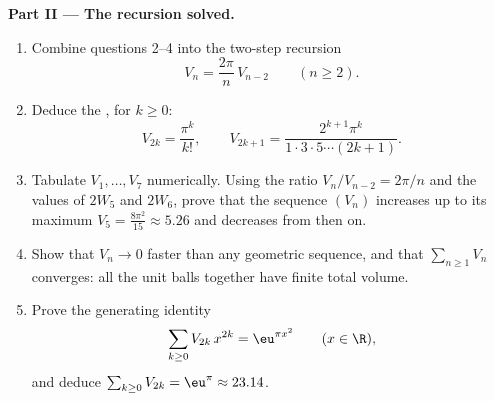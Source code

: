 \begin{problem}[{Weekend problem --- $V_n =
\pi^{n/2}/\Gamma(\frac n2 + 1)$, and the strangeness of high
dimensions}]
\medskip
\noindent\textbf{Part II --- The recursion solved.}
\begin{enumerate}[resume]
  \item Combine questions 2--4 into the two-step recursion
        \[
        V_n = \frac{2\pi}{n}\,V_{n-2}
        \qquad (n \geq 2).
        \]
  \item Deduce the , for $k \geq 0$:
        \[
        V_{2k} = \frac{\pi^k}{k!},
        \qquad
        V_{2k+1} = \frac{2^{k+1}\pi^k}{1\cdot3\cdot5\cdots
        (2k+1)} .
        \]
  \item Tabulate $V_1, \dots, V_7$ numerically. Using the
        ratio $V_n/V_{n-2} = 2\pi/n$ and the values of $2W_5$
        and $2W_6$, prove that the sequence $(V_n)$ increases
        up to its maximum $V_5 = \frac{8\pi^2}{15} \approx
        5.26$ and decreases from then on.
  \item Show that $V_n \to 0$ faster than any geometric
        sequence, and that $\sum_{n\geq1} V_n$ converges: all
        the unit balls together have finite total volume.
  \item Prove the generating identity
        \[
        \sum_{k\geq0} V_{2k}\,x^{2k} = \eu^{\pi x^2}
        \qquad (x \in \R),
        \]
        and deduce $\sum_{k\geq0}V_{2k} = \eu^\pi \approx
        23.14$.
\end{enumerate}


\end{problem}
